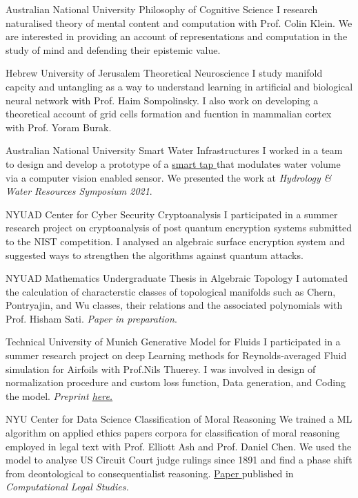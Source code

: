 {Australian National University}
{Philosophy of Cognitive Science}
{
	I research naturalised theory of mental content and computation with Prof. Colin Klein. We are interested in providing an account of representations and computation in the study of mind and defending their epistemic value.
}

{Hebrew University of Jerusalem}
{Theoretical Neuroscience}
{
	I study manifold capcity and untangling as a way to understand learning in artificial and biological neural network with Prof. Haim Sompolinsky. I also work on developing a theoretical account of grid cells formation and fucntion in mammalian cortex with Prof. Yoram Burak.  
}

{Australian National University}
{Smart Water Infrastructures}
{
	I worked in a team to design and develop a prototype of a 
	\href{http://tappyvision.herokuapp.com}{
		smart tap
	}that modulates water volume via a computer vision enabled sensor. We presented the work at \textit{Hydrology \& Water Resources Symposium 2021}.
}

{NYUAD Center for Cyber Security}
{Cryptoanalysis}
{
	I participated in a summer research project on cryptoanalysis of post quantum encryption systems submitted to the NIST competition. I analysed an algebraic surface encryption system and suggested ways to strengthen the algorithms against quantum attacks.
}

{NYUAD Mathematics}
{Undergraduate Thesis in Algebraic Topology}
{
	I automated the calculation of characterstic classes of topological manifolds such as Chern, Pontryajin, and Wu classes, their relations and the associated polynomials with Prof. Hisham Sati. \textit{Paper in preparation}.
}

{Technical University of Munich}
{Generative Model for Fluids}
{
	I participated in a summer research project on deep Learning methods for Reynolds-averaged Fluid simulation for Airfoils with Prof.Nils Thuerey. I was involved in design of normalization procedure and custom loss function, Data generation, and Coding the model. 
	\textit{ Preprint
		\href{https://www.researchgate.net/publication/328418525_Well_how_accurate_is_it_A_Study_of_Deep_Learning_Methods_for_Reynolds-Averaged_Navier-Stokes_Simulations}{
		here.
		}
	}
}

{NYU Center for Data Science}
{Classification of Moral Reasoning}
{
	We trained a ML algorithm on applied ethics papers corpora for classification of moral reasoning employed in legal text with Prof. Elliott Ash and Prof. Daniel Chen. We used the model to analyse US Circuit Court judge rulings since 1891 and find a phase shift from deontological to consequentialist reasoning.
	\href{https://papers.ssrn.com/sol3/papers.cfm?abstract_id=3205286}{
		Paper
		}published in \textit{Computational Legal Studies.}
}

